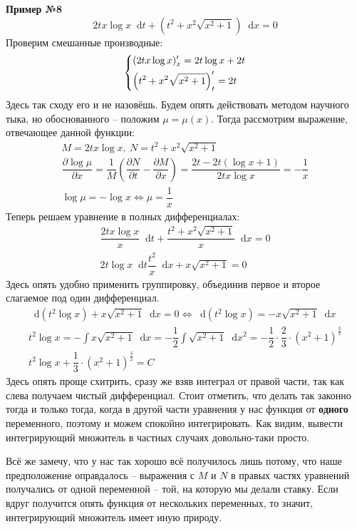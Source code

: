 \documentclass[a4paper,12pt]{article}
\renewcommand*\d{\mathop{}\!\mathrm{d}}
\newcommand{\ds}{\displaystyle}
\begin{document}
\textbf{Пример №8}
\[2tx\log x\d t + \left(t^2 + x^2\sqrt{x^2 + 1}\right)\d x = 0\]
Проверим смешанные производные:
\[\left\{\begin{gathered}
(2tx\log x)'_x = 2t\log x + 2t\hfill\\
\left(t^2 + x^2\sqrt{x^2 + 1}\right)'_t = 2t\hfill
\end{gathered}\right.\]
Здесь так сходу его и не назовёшь. Будем опять действовать методом научного тыка, но обоснованного -- положим $\mu = \mu(x)$. Тогда рассмотрим выражение, отвечающее данной функции:
\begin{gather*}
	M = 2tx\log x,\ N = t^2 + x^2\sqrt{x^2 + 1}\\
	\dfrac{\partial \log\mu}{\partial x} = \dfrac{1}{M}\left(\dfrac{\partial N}{\partial t} - \dfrac{\partial M}{\partial x}\right) = \dfrac{2t - 2t(\log x + 1)}{2tx\log x} = -\dfrac{1}{x} \\
	\log\mu = -\log x \iff \mu = \dfrac{1}{x}
\end{gather*}
Теперь решаем уравнение в полных дифференциалах:
\begin{gather*}
	\dfrac{2tx\log x}{x}\d t + \dfrac{t^2 + x^2\sqrt{x^2 + 1}}{x}\d x = 0\\
	2t\log x\d t \dfrac{t^2}{x}\d x + x\sqrt{x^2 + 1} = 0
\end{gather*}
Здесь опять удобно применить группировку, объединив первое и второе слагаемое под один дифференциал.
\begin{gather*}
	\d(t^2\log x) + x\sqrt{x^2 + 1}\d x = 0 \iff \d(t^2\log x) = -x\sqrt{x^2 + 1}\d x\\
	t^2\log x = -\ds\int x\sqrt{x^2 + 1}\d x = -\dfrac{1}{2}\ds\int\sqrt{x^2 + 1}\d x^2 = -\dfrac{1}{2} \cdot \dfrac{2}{3}\cdot \left(x^2 + 1\right)^{\frac{3}{2}}\\
	t^2\log x + \dfrac{1}{3}\cdot \left(x^2 + 1\right)^{\frac{3}{2}} = C
\end{gather*}
Здесь опять проще схитрить, сразу же взяв интеграл от правой части, так как слева получаем чистый дифференциал. Стоит отметить, что делать так законно тогда и только тогда, когда в другой части уравнения у нас функция от \textbf{одного} переменного, поэтому и можем спокойно интегрировать. Как видим, вывести интегрирующий множитель в частных случаях довольно-таки просто. 

Всё же замечу, что у нас так хорошо всё получилось лишь потому, что наше предположение оправдалось -- выражения с $M$ и $N$  в правых частях уравнений получались от одной переменной -- той, на которую мы делали ставку. Если вдруг получится опять функция от нескольких переменных, то значит, интегрирующий множитель имеет иную природу.
\end{document}
